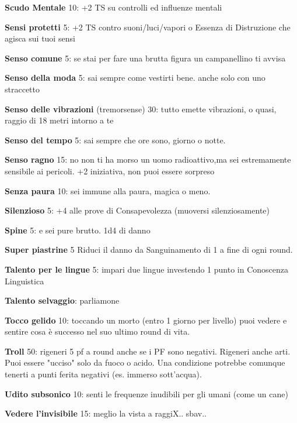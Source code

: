 \documentclass[a4paper,11pt,twoside,openany]{book}
\begin{document}
\textbf{Scudo Mentale} 10: +2 TS su controlli ed influenze mentali

\textbf{Sensi protetti} 5: +2 TS contro suoni/luci/vapori o Essenza di Distruzione che agisca sui tuoi sensi

\textbf{Senso comune} 5: se stai per fare una brutta figura un campanellino ti avvisa

\textbf{Senso della moda} 5: sai sempre come vestirti bene. anche solo con uno straccetto

\textbf{Senso delle vibrazioni}   (tremorsense) 30: tutto emette vibrazioni, o quasi, raggio di 18 metri intorno a te

\textbf{Senso del tempo} 5: sai sempre che ore sono, giorno o notte.

\textbf{Senso ragno} 15: no non ti ha morso un uomo radioattivo,ma sei estremamente sensibile ai pericoli. +2 iniziativa, non puoi essere sorpreso

\textbf{Senza paura} 10: sei immune alla paura, magica o meno.

\textbf{Silenzioso} 5: +4 alle prove di Consapevolezza (muoversi silenziosamente)

\textbf{Spine} 5: e sei pure brutto. 1d4 di danno

\textbf{Super piastrine} 5 Riduci il danno da Sanguinamento di 1 a fine di ogni round.

\textbf{Talento per le lingue} 5: impari due lingue investendo 1 punto in Conoscenza Linguistica

\textbf{Talento selvaggio}: parliamone

\textbf{Tocco gelido} 10: toccando un morto (entro 1 giorno per livello) puoi vedere e sentire cosa è successo nel suo ultimo round di vita.

\textbf{Troll} 50: rigeneri 5 pf a round anche se i PF sono negativi. Rigeneri anche arti. Puoi essere "ucciso" solo da fuoco o acido. Una condizione potrebbe comunque tenerti a punti ferita negativi (es. immerso sott'acqua).

\textbf{Udito subsonico} 10: senti le frequenze inudibili per gli umani (come un cane)

\textbf{Vedere l'invisibile} 15: meglio la vista a raggiX.. sbav..
\end{document}
